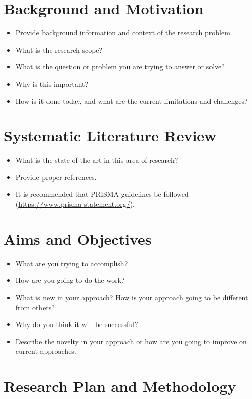 \documentclass{article}
\begin{document}
\section{Background and Motivation}
\begin{itemize}
	\item Provide background information and context of the research problem.
	\item What is the research scope?
	\item What is the question or problem you are trying to answer or solve?
	\item Why is this important?
	\item How is it done today, and what are the current limitations and challenges?
\end{itemize}

\section{Systematic Literature Review}
\begin{itemize}
	\item What is the state of the art in this area of research?
	\item Provide proper references.
	\item It is recommended that PRISMA guidelines be followed (\url{https://www.prisma-statement.org/}).
\end{itemize}

\section{Aims and Objectives}
\begin{itemize}
	\item What are you trying to accomplish?
	\item How are you going to do the work?
	\item What is new in your approach? How is your approach going to be different from others?
	\item Why do you think it will be successful?
	\item Describe the novelty in your approach or how are you going to improve on current approaches.
\end{itemize}

\section{Research Plan and Methodology}
\end{document}

